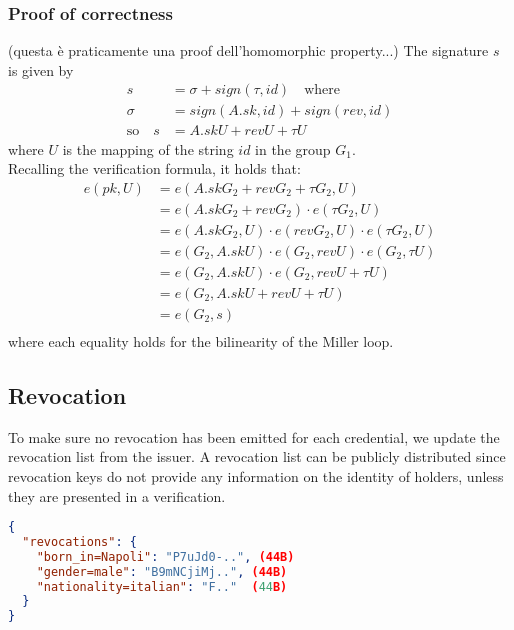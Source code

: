 \documentclass[conference]{IEEEtran}
\begin{document}
\subsubsection{Proof of correctness}
(questa è praticamente una proof dell'homomorphic property...)
The signature $s$ is given by
\begin{equation*}
\begin{split}
    s &= \sigma + sign(\tau, id) \quad \text{where} \\
    \sigma &= sign(A.sk, id) + sign(rev, id) \\
    \text{so} \quad s &= A.sk U + rev U + \tau U  
\end{split}
\end{equation*}
where $U$ is the mapping of the string $id$ in the group $G_1$.\\
Recalling the verification formula, it holds that:
\begin{equation*}
\begin{split}
 e(pk, U) &= e(A.skG_2 + revG_2 + \tau G_2, U) \\
 &= e(A.skG_2 + revG_2)\cdot e(\tau G_2, U) \\
 &= e(A.skG_2, U) \cdot e(revG_2, U) \cdot e(\tau G_2, U) \\
 &= e(G_2, A.sk U) \cdot e(G_2, rev U) \cdot e(G_2, \tau U) \\
 &= e(G_2, A.sk U) \cdot e(G_2, rev U + \tau U) \\
 &= e(G_2, A.sk U + rev U + \tau U) \\
 &= e(G_2, s) \\
\end{split}    
\end{equation*}
where each equality holds for the bilinearity of the Miller loop.

\subsection{Revocation}

To make sure no revocation has been emitted for each credential, we update the revocation list from the issuer. A revocation list can be publicly distributed since revocation keys do not provide any information on the identity of holders, unless they are presented in a verification.

\begin{lstlisting}[language=json,caption={Revocation list}]
{
  "revocations": {
    "born_in=Napoli": "P7uJd0-..", (44B)
    "gender=male": "B9mNCjiMj..", (44B)
    "nationality=italian": "F.."  (44B)
  }
}
\end{lstlisting}
\end{document}
